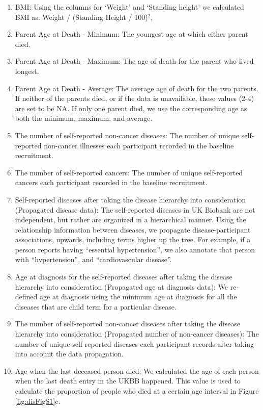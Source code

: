 \documentclass[12pt,twoside]{unicam}
\providecommand{\tightlist}{%
  \setlength{\itemsep}{0pt}\setlength{\parskip}{0pt}}
\begin{document}
\begin{enumerate}
\def\labelenumi{\arabic{enumi}.}
\tightlist
\item
  BMI: Using the columns for `Weight' and `Standing height' we calculated BMI as: Weight / (Standing Height / 100)\(^2\),
\item
  Parent Age at Death - Minimum: The youngest age at which either parent died.
\item
  Parent Age at Death - Maximum: The age of death for the parent who lived longest.
\item
  Parent Age at Death - Average: The average age of death for the two parents. If neither of the parents died, or if the data is unavailable, these values (2-4) are set to be NA. If only one parent died, we use the corresponding age as both the minimum, maximum, and average.
\item
  The number of self-reported non-cancer diseases: The number of unique self-reported non-cancer illnesses each participant recorded in the baseline recruitment.
\item
  The number of self-reported cancers: The number of unique self-reported cancers each participant recorded in the baseline recruitment.
\item
  Self-reported diseases after taking the disease hierarchy into consideration (Propagated disease data): The self-reported diseases in UK Biobank are not independent, but rather are organized in a hierarchical manner. Using the relationship information between diseases, we propagate disease-participant associations, upwards, including terms higher up the tree. For example, if a person reports having ``essential hypertension'', we also annotate that person with ``hypertension'', and ``cardiovascular disease''.
\item
  Age at diagnosis for the self-reported diseases after taking the disease hierarchy into consideration (Propagated age at diagnosis data): We re-defined age at diagnosis using the minimum age at diagnosis for all the diseases that are child term for a particular disease.
\item
  The number of self-reported non-cancer diseases after taking the disease hierarchy into consideration (Propagated number of non-cancer diseases): The number of unique self-reported diseases each participant records after taking into account the data propagation.
\item
  Age when the last deceased person died: We calculated the age of each person when the last death entry in the UKBB happened. This value is used to calculate the proportion of people who died at a certain age interval in Figure \ref{fig:disFigS1}c.
\end{enumerate}
\end{document}
